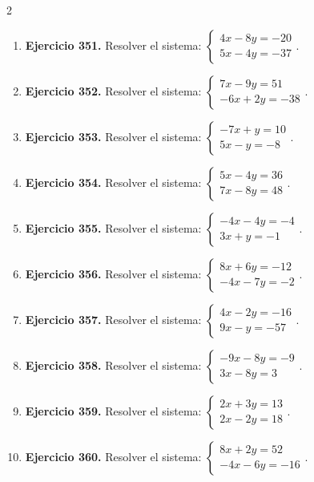\documentclass[10pt,a4paper]{article}
\begin{document}
\begin{multicols}{2}
\begin{enumerate}[label=\textbf{\arabic*.}]
\item \textbf{Ejercicio 351.} Resolver el sistema: \(\begin{cases}4 x - 8 y=-20\\5 x - 4 y=-37\end{cases}\).
\item \textbf{Ejercicio 352.} Resolver el sistema: \(\begin{cases}7 x - 9 y=51\\- 6 x + 2 y=-38\end{cases}\).
\item \textbf{Ejercicio 353.} Resolver el sistema: \(\begin{cases}- 7 x + y=10\\5 x - y=-8\end{cases}\).
\item \textbf{Ejercicio 354.} Resolver el sistema: \(\begin{cases}5 x - 4 y=36\\7 x - 8 y=48\end{cases}\).
\item \textbf{Ejercicio 355.} Resolver el sistema: \(\begin{cases}- 4 x - 4 y=-4\\3 x + y=-1\end{cases}\).
\item \textbf{Ejercicio 356.} Resolver el sistema: \(\begin{cases}8 x + 6 y=-12\\- 4 x - 7 y=-2\end{cases}\).
\item \textbf{Ejercicio 357.} Resolver el sistema: \(\begin{cases}4 x - 2 y=-16\\9 x - y=-57\end{cases}\).
\item \textbf{Ejercicio 358.} Resolver el sistema: \(\begin{cases}- 9 x - 8 y=-9\\3 x - 8 y=3\end{cases}\).
\item \textbf{Ejercicio 359.} Resolver el sistema: \(\begin{cases}2 x + 3 y=13\\2 x - 2 y=18\end{cases}\).
\item \textbf{Ejercicio 360.} Resolver el sistema: \(\begin{cases}8 x + 2 y=52\\- 4 x - 6 y=-16\end{cases}\).
\end{enumerate}
\end{multicols}
\end{document}
